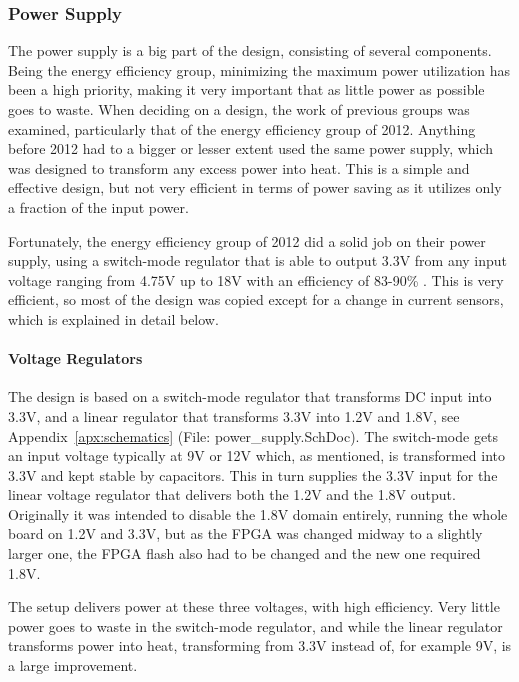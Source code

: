 
\subsubsection{Power Supply}

The power supply is a big part of the design, consisting of several components. Being the energy efficiency
group, minimizing the maximum power utilization has been a high priority, making
it very important that as little power as possible goes to waste. When deciding
on a design, the work of previous groups was examined, particularly that of the
energy efficiency group of 2012. Anything before 2012 had to a bigger or lesser
extent used the same power supply, which was designed to transform any excess
power into heat. This is a simple and effective design, but not very efficient
in terms of power saving as it utilizes only a fraction of the input power.

Fortunately, the energy efficiency group of 2012 did a solid job on their power
supply, using a switch-mode regulator that is able to output 3.3V from any input
voltage ranging from 4.75V up to 18V with an efficiency of 83-90\% . This is very efficient, so most of the design
was copied except for a change in current sensors, which is explained in detail
below.

\paragraph{Voltage Regulators}

The design is based on a switch-mode regulator that transforms DC input into
3.3V, and a linear regulator
that transforms 3.3V into 1.2V and 1.8V, see Appendix~\ref{apx:schematics}
(File: power\_supply.SchDoc). The
switch-mode gets an input voltage typically at 9V or 12V which, as mentioned, is
transformed into 3.3V and kept stable by capacitors. This in turn supplies the
3.3V input for the linear voltage regulator that delivers both the 1.2V and the
1.8V output. Originally it was intended to disable the 1.8V domain entirely,
running the whole board on 1.2V and 3.3V, but as the FPGA was changed midway to
a slightly larger one, the FPGA flash also had to be changed and the new one
required 1.8V.

The setup delivers power at these three voltages, with high efficiency. Very
little power goes to waste in the switch-mode regulator, and while the linear
regulator transforms power into heat, transforming from 3.3V instead of, for
example 9V, is a large improvement.

